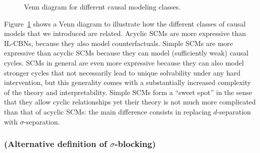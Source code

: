 \begin{figure}\centering
  \caption{Venn diagram for different causal modeling classes.\label{fig:venn_diagram_scms}}
\end{figure}
Figure~\ref{fig:venn_diagram_scms} shows a Venn diagram to illustrate how the different
classes of causal models that we introduced are related.
Acyclic SCMs are more expressive than IL-CBNs, because they also model counterfactuals.
Simple SCMs are more expressive than acyclic SCMs because they can model (sufficiently
weak) causal cycles. SCMs in general are even more expressive because they can also
model stronger cycles that not necessarily lead to unique solvability under any hard
intervention, but this generality comes with a substantially increased complexity of
the theory and interpretability. Simple SCMs form a ``sweet spot'' in the sense that they allow cyclic
relationships yet their theory is not much more complicated than that of acyclic SCMs:
the main difference consists in replacing $d$-separation with $\sigma$-separation.

\subsubsection{(Alternative definition of $\sigma$-blocking)}

